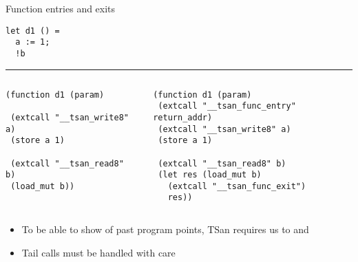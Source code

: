 \begin{frame}[fragile]{Function entries and exits}
  \begin{verbatim}
let d1 () =
  a := 1;
  !b
  \end{verbatim}
  \vspace{-15pt}%
  \par\noindent\rule{\textwidth}{0.4pt}
  \vspace{-15pt}%
  \begin{columns}[T]
    \begin{column}{0.45\textwidth}
      \begin{verbatim}
(function d1 (param)

 (extcall "__tsan_write8" a)
 (store a 1)

 (extcall "__tsan_read8" b)
 (load_mut b))
      \end{verbatim}
    \end{column}
    \begin{column}{0.55\textwidth}
      \begin{overprint}
      \begin{verbatim}
(function d1 (param)
 (extcall "__tsan_func_entry" return_addr)
 (extcall "__tsan_write8" a)
 (store a 1)

 (extcall "__tsan_read8" b)
 (let res (load_mut b)
   (extcall "__tsan_func_exit")
   res))
      \end{verbatim}
      \end{overprint}
    \end{column}
  \end{columns}

  \small
  \begin{itemize}
    \item To be able to show  of past program points, TSan requires us to   and 
    \item Tail calls must be handled with care
  \end{itemize}
\end{frame}


